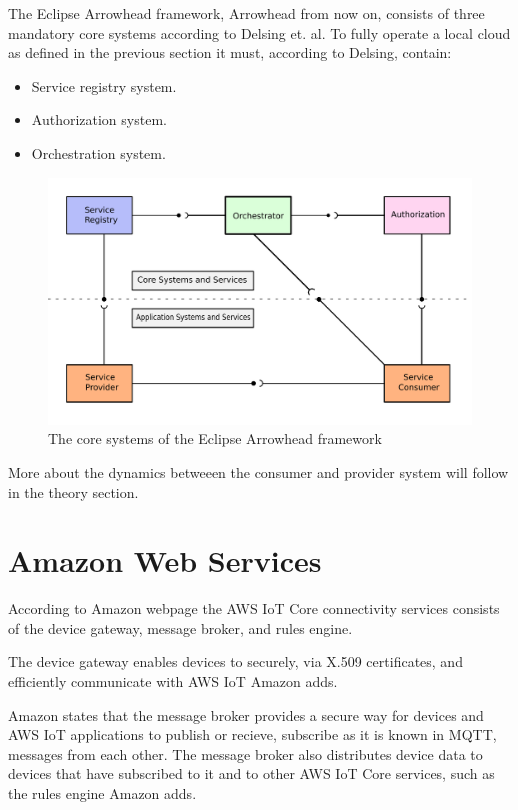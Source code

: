 The Eclipse Arrowhead framework, Arrowhead from now on, consists of three mandatory core systems according to Delsing et. al.
To fully operate a local cloud as defined in the previous section it must, according to Delsing, contain:
\begin{itemize}
    \item Service registry system.
    \item Authorization system. 
    \item Orchestration system.\cite{Delsing2017}
\end{itemize} 

\begin{figure}[H]
    \centering
    \includegraphics[width=\textwidth]{Pictures/ah.pdf} 
    \caption{The core systems of the Eclipse Arrowhead framework}
    \label{diagram arrowhead}
\end{figure}
More about the dynamics betweeen the consumer and provider system will follow in the theory section.
\section{Amazon Web Services}
According to Amazon webpage the AWS IoT Core connectivity  services consists of the device gateway, message broker, and rules engine.

The device gateway enables devices to securely, via X.509 certificates, and efficiently communicate with AWS IoT Amazon adds.

Amazon states that the message broker provides a secure way for devices and AWS IoT applications to publish or recieve, subscribe as it is known in MQTT, messages from each other.
The message broker also distributes device data to devices that have subscribed to it and to other AWS IoT Core services, such as the rules engine Amazon adds. 

